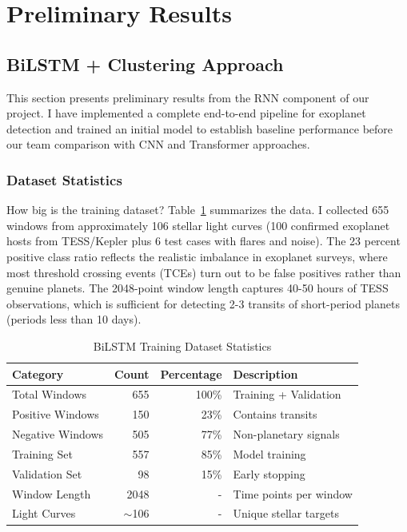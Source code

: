 \documentclass[letterpaper]{article} %
\begin{document}
\section*{Preliminary Results}

\subsection{BiLSTM + Clustering Approach}

This section presents preliminary results from the RNN component of our project. I have implemented a complete end-to-end pipeline for exoplanet detection and trained an initial model to establish baseline performance before our team comparison with CNN and Transformer approaches.

\subsubsection{Dataset Statistics}

How big is the training dataset? Table~\ref{tab:bilstm_dataset} summarizes the data. I collected 655 windows from approximately 106 stellar light curves (100 confirmed exoplanet hosts from TESS/Kepler plus 6 test cases with flares and noise). The 23 percent positive class ratio reflects the realistic imbalance in exoplanet surveys, where most threshold crossing events (TCEs) turn out to be false positives rather than genuine planets. The 2048-point window length captures 40-50 hours of TESS observations, which is sufficient for detecting 2-3 transits of short-period planets (periods less than 10 days).

\begin{table}[h]
\centering
\caption{BiLSTM Training Dataset Statistics}
\label{tab:bilstm_dataset}
\begin{tabular}{@{}lrrl@{}}
\toprule
\textbf{Category} & \textbf{Count} & \textbf{Percentage} & \textbf{Description} \\
\midrule
Total Windows & 655 & 100\% & Training + Validation \\
Positive Windows & 150 & 23\% & Contains transits \\
Negative Windows & 505 & 77\% & Non-planetary signals \\
Training Set & 557 & 85\% & Model training \\
Validation Set & 98 & 15\% & Early stopping \\
Window Length & 2048 & - & Time points per window \\
Light Curves & $\sim$106 & - & Unique stellar targets \\
\bottomrule
\end{tabular}
\end{table}
\end{document}
